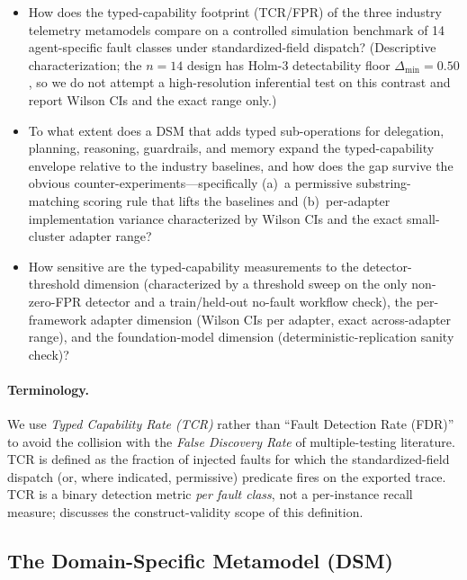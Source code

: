 \documentclass[a4paper,UKenglish,cleveref,autoref,thm-restate]{lipics-v2021}
\begin{document}
\begin{itemize}
\item[\textbf{RQ1}] How does the typed-capability footprint
(TCR/FPR) of the three industry telemetry metamodels compare on a
controlled simulation benchmark of 14 agent-specific fault classes
under standardized-field dispatch? (Descriptive characterization;
the $n = 14$ design has Holm-3 detectability floor $\Delta_{\min} =
0.50$, so we do not attempt a high-resolution inferential test on
this contrast and report Wilson CIs and the exact range only.)
\item[\textbf{RQ2}] To what extent does a DSM that adds typed
sub-operations for delegation, planning, reasoning, guardrails, and
memory expand the typed-capability envelope relative to the industry
baselines, and how does the gap survive the obvious
counter-experiments---specifically (a)~a permissive substring-matching
scoring rule that lifts the baselines and (b)~per-adapter
implementation variance characterized by Wilson CIs and the exact
small-cluster adapter range?
\item[\textbf{RQ3}] How sensitive are the typed-capability
measurements to the detector-threshold dimension (characterized by a
threshold sweep on the only non-zero-FPR detector and a
train/held-out no-fault workflow check), the per-framework adapter
dimension (Wilson CIs per adapter, exact across-adapter range), and
the foundation-model dimension
(deterministic-replication sanity check)?
\end{itemize}

\paragraph*{Terminology.} We use \emph{Typed Capability Rate (TCR)}
rather than ``Fault Detection Rate (FDR)'' to avoid the
collision with the \emph{False Discovery Rate} of multiple-testing
literature.  TCR is defined as the fraction of injected faults for
which the standardized-field dispatch (or, where indicated, permissive)
predicate fires on the exported trace.  TCR is a binary detection
metric \emph{per fault class}, not a per-instance recall measure;
 discusses the construct-validity scope of this
definition.

\subsection{The Domain-Specific Metamodel (DSM)}
\label{sec:dsm}
\end{document}
